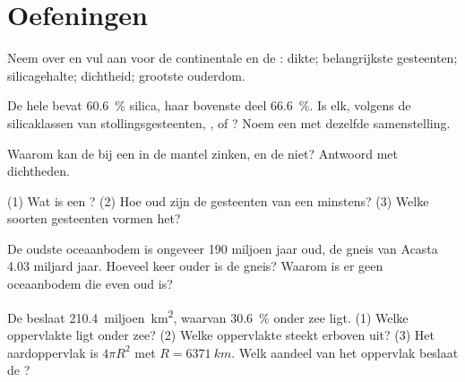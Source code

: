 \section{Oefeningen}

\begin{exercise}[$\star$]\label{exo:g12:continental-crust:1}
Neem over en vul aan voor de continentale en de : dikte;
belangrijkste gesteenten; silicagehalte; dichtheid; grootste ouderdom.
\end{exercise}

\begin{exercise}[$\star$]\label{exo:g12:continental-crust:2}
De hele  bevat \qty{60.6}{\percent} silica, haar bovenste
deel \qty{66.6}{\percent}. Is elk, volgens de silicaklassen van stollingsgesteenten,
,  of ? Noem een  met dezelfde
samenstelling.
\end{exercise}

\begin{exercise}[$\star$]\label{exo:g12:continental-crust:3}
Waarom kan de  bij een  in de mantel zinken, en
de  niet? Antwoord met dichtheden.
\end{exercise}

\begin{exercise}[$\star$]\label{exo:g12:continental-crust:4}
(1) Wat is een ? (2) Hoe oud zijn de gesteenten van een  minstens?
(3) Welke soorten gesteenten vormen het?
\end{exercise}

\begin{exercise}[$\star$]\label{exo:g12:continental-crust:5}
De oudste oceaanbodem is ongeveer 190 miljoen jaar oud, de gneis van Acasta
4.03 miljard jaar. Hoeveel keer ouder is de gneis? Waarom is er geen
oceaanbodem die even oud is?
\end{exercise}

\begin{exercise}[$\star\star$]\label{exo:g12:continental-crust:6}
De  beslaat \num{210.4}~miljoen~\unit{km^2}, waarvan
\qty{30.6}{\percent} onder zee ligt. (1) Welke oppervlakte 
ligt onder zee? (2) Welke oppervlakte steekt erboven uit? (3) Het aardoppervlak is
$4\pi R^2$ met $R = \qty{6371}{km}$. Welk aandeel van het oppervlak beslaat de
?
\end{exercise}

